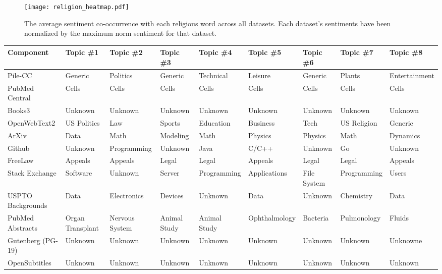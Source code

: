 \documentclass[11pt,a4paper]{article}
\begin{document}
\begin{appendices}
\begin{figure}[ht]
    \centering
    \texttt{[image: religion\_heatmap.pdf]}
    \caption{The average sentiment co-occurrence with each religious word across all datasets. Each dataset's sentiments have been normalized by the maximum norm sentiment for that dataset.}
    \label{fig:religion_sentiment}
\end{figure}


\begin{table*}[p]
\begin{tiny}
\begin{tabular}{|p{}|p{}p{}p{}p{}p{}p{}p{}p{}|}
\hline
Component & Topic \#1 & Topic \#2 & Topic \#3 & Topic \#4 & Topic \#5 & Topic \#6 & Topic \#7 & Topic \#8\\\hline
Pile-CC & Generic & Politics & Generic & Technical & Leisure & Generic & Plants & Entertainment\\\hline
PubMed Central & Cells & Cells & Cells & Cells & Cells & Cells & Cells & Cells\\\hline
Books3 & Unknown & Unknown & Unknown & Unknown & Unknown & Unknown & Unknown & Unknown\\\hline
OpenWebText2 & US Politics & Law & Sports & Education & Business & Tech & US Religion & Generic\\\hline
ArXiv & Data & Math & Modeling & Math & Physics & Physics & Math & Dynamics\\\hline
Github & Unknown & Programming & Unknown & Java & C/C++ & Unknown & Go & Unknown\\\hline
FreeLaw & Appeals & Appeals & Legal & Legal & Appeals & Legal & Legal & Appeals\\\hline
Stack Exchange & Software & Unknown & Server & Programming & Applications & File System & Programming & Users\\\hline
USPTO Backgrounds & Data & Electronics & Devices & Unknown & Data & Unknown & Chemistry & Data\\\hline
PubMed Abstracts & Organ Transplant & Nervous System & Animal Study & Animal Study & Ophthalmology & Bacteria & Pulmonology & Fluids\\\hline
Gutenberg (PG-19) & Unknown & Unknown & Unknown & Unknown & Unknown & Unknown & Unknown & Unknowne\\\hline
OpenSubtitles & Unknown & Unknown & Unknown & Unknown & Unknown & Unknown & Unknown & Unknown\\\hline

\end{tabular}
\end{tiny}
\end{table*}
\end{appendices}
\end{document}

